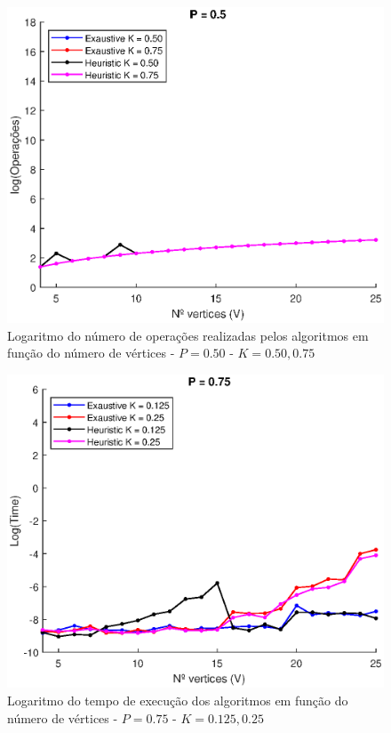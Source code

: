 \documentclass{revdetua}
\begin{document}
\begin{figure}[h!]
\centering
\includegraphics[scale = 0.5]{Figs/4_P050.eps}
\caption{Logaritmo do número de operações realizadas pelos algoritmos em função do número de vértices - $P = 0.50$ - $K = 0.50, 0.75$}
\label{4_P050}
\end{figure}


\begin{figure}[h!]
\centering
\includegraphics[scale = 0.5]{Figs/1_P075.eps}
\caption{Logaritmo do tempo de execução dos algoritmos em função do número de vértices - $P = 0.75$ - $K = 0.125, 0.25$}
\label{1_P075}
\end{figure}
\end{document}

